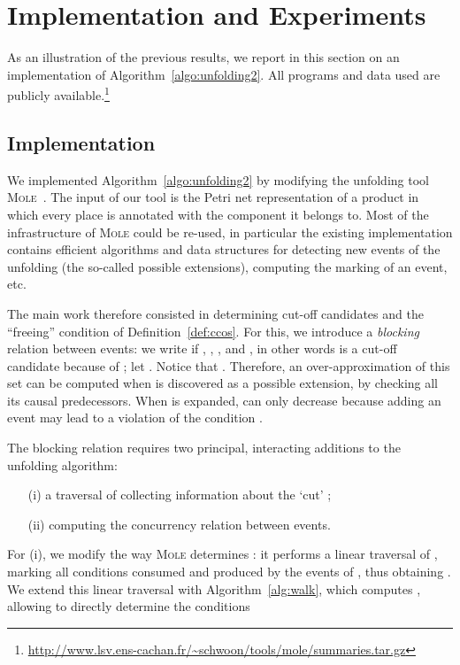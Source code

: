 \documentclass{llncs}
\begin{document}
\section{Implementation and Experiments}

\label{sec:exp}

As an illustration of the previous results, we report in this section on an implementation of 
Algorithm~\ref{algo:unfolding2}. All programs and data
used are publicly available.\footnote{\url{http://www.lsv.ens-cachan.fr/~schwoon/tools/mole/summaries.tar.gz}}

\subsection{Implementation}

We implemented Algorithm~\ref{algo:unfolding2} by modifying the
unfolding tool \textsc{Mole}~\cite{Mole}. The input of our tool is
the Petri net representation of a product  in which every place
is annotated with the component it belongs to. Most of the infrastructure
of \textsc{Mole} could be re-used, in particular the existing implementation
contains efficient algorithms and data structures \cite{Esparza96}
for detecting new events
of the unfolding (the so-called possible extensions), computing the marking
 of an event, etc.

The main work therefore consisted in determining cut-off candidates and
the ``freeing'' condition of Definition~\ref{def:ccos}.
For this, we introduce a \emph{blocking} relation between events: we write
 if , , , and
, in other words  is a cut-off
candidate because of ; let .
Notice that .
Therefore, an over-approximation of this set can be computed when
 is discovered as a possible extension, by checking all its causal
predecessors. When  is expanded,  can only decrease
because adding an event may lead to a violation of the condition
.

The blocking relation requires two principal, interacting additions
to the unfolding algorithm:
\begin{itemize}
\item[(i)] a traversal of  collecting information about
  the `cut' ;
\item[(ii)] computing the concurrency relation between events.
\end{itemize}

For (i), we modify the way \textsc{Mole} determines :
it performs a linear traversal of , marking all conditions
consumed and produced by the events of , thus obtaining .
We extend this linear traversal with Algorithm~\ref{alg:walk}, which computes
, allowing to directly determine the conditions
\end{document}
